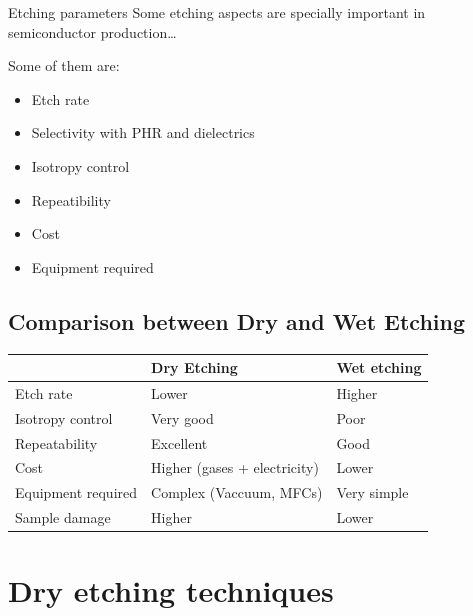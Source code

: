 \documentclass{beamer}
\begin{document}
\begin{frame}{Etching parameters}
Some etching aspects are specially important in semiconductor production\dots

   Some of them are:
      \pause
    \begin{itemize}
    \item
 	Etch rate
      \pause
    \item
 	Selectivity with PHR and dielectrics
      \pause
    \item
 	Isotropy control
      \pause
    \item
	Repeatibility
      \pause
    \item
	Cost
      \pause
    \item
	Equipment required
    \end{itemize}
\end{frame}

\subsection{Comparison between Dry and Wet Etching}

\begin{center}
    \begin{tabular}{ | l | l |l|}
    \hline
     & Dry Etching & Wet etching  \\ \hline
    Etch rate & Lower & Higher  
 \\ \hline

    Isotropy control & Very good & Poor \\ \hline
    Repeatability  & Excellent & Good 
   \\ \hline
Cost  & Higher (gases + electricity) & Lower
   \\ \hline
Equipment required  & Complex (Vaccuum,  MFCs) & Very simple 
   \\ \hline
Sample damage  & Higher & Lower 
   \\ \hline
    \end{tabular}
\end{center}



\section{Dry etching techniques}
\end{document}
